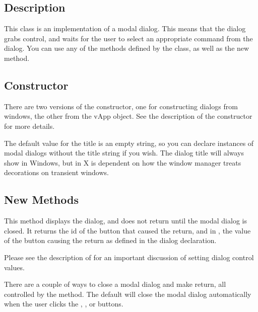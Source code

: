 \subsection* {Description}

This class is an implementation of a modal dialog.  This means
that the dialog grabs control, and waits for the user to select
an appropriate command from the dialog.  You can use any of
the methods defined by the  class, as well as the
new  method.

\subsection* {Constructor} %


There are two versions of the constructor, one for constructing
dialogs from windows, the other from the vApp object. See the
description of the  constructor for more details.

The default value for the title is an empty string, so you
can declare instances of modal dialogs without the title
string if you wish. The dialog title will always show in
Windows, but in X is dependent on how the window manager
treats decorations on transient windows.

\subsection* {New Methods}


This method displays the dialog, and does not return until
the modal dialog is closed. It returns the id of the
button that caused the return, and in , the value of
the button causing the return as defined in the dialog
declaration.

Please see the description of 
for an important discussion of setting dialog control values.

There are a couple of ways to close a modal dialog and make
 return, all controlled by the 
method. The default  will close the modal
dialog automatically when the user clicks the ,
, or  buttons.

